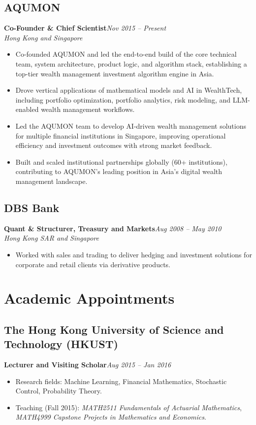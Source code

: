 \documentclass[11pt]{article}
\newcommand{\role}[2]{\textbf{#1}\hfill \textit{#2}}
\newcommand{\place}[1]{\textit{#1}}
\begin{document}
\subsection*{AQUMON}
\role{Co-Founder \& Chief Scientist}{Nov 2015 -- Present}
\\ \place{Hong Kong and Singapore}
\begin{itemize}
  \item Co-founded AQUMON and led the end-to-end build of the core technical team, system architecture, product logic, and algorithm stack, establishing a top-tier wealth management investment algorithm engine in Asia.
  \item Drove vertical applications of mathematical models and AI in WealthTech, including portfolio optimization, portfolio analytics, risk modeling, and LLM-enabled wealth management workflows.
  \item Led the AQUMON team to develop AI-driven wealth management solutions for multiple financial institutions in Singapore, improving operational efficiency and investment outcomes with strong market feedback.
  \item Built and scaled institutional partnerships globally (60+ institutions), contributing to AQUMON's leading position in Asia's digital wealth management landscape.
\end{itemize}

\subsection*{DBS Bank}
\role{Quant \& Structurer, Treasury and Markets}{Aug 2008 -- May 2010}
\\ \place{Hong Kong SAR and Singapore}
\begin{itemize}
  \item Worked with sales and trading to deliver hedging and investment solutions for corporate and retail clients via derivative products.
\end{itemize}

\section{Academic Appointments}

\subsection*{The Hong Kong University of Science and Technology (HKUST)}
\role{Lecturer and Visiting Scholar}{Aug 2015 -- Jan 2016}
\begin{itemize}
  \item Research fields: Machine Learning, Financial Mathematics, Stochastic Control, Probability Theory.
  \item Teaching (Fall 2015): \textit{MATH2511 Fundamentals of Actuarial Mathematics}, \textit{MATH4999 Capstone Projects in Mathematics and Economics}.
\end{itemize}
\end{document}
